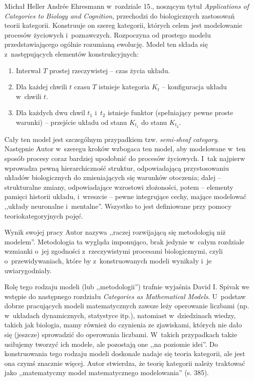 \begin{recplenv}{Michał Heller}
Andr\'ee Ehresmann w~rozdziale 15., noszącym tytuł \textit{Applications of Categories to Biology and Cognition}, przechodzi do biologicznych zastosowań teorii kategorii. Konstruuje on szereg kategorii, których celem jest modelowanie procesów życiowych i~poznawczych. Rozpoczyna od prostego modelu przedstawiającego ogólnie rozumianą ewolucję. Model ten składa się z~następujących elementów konstrukcyjnych:
\begin{enumerate}
\item
Interwał $T$ prostej rzeczywistej -- czas życia układu.
\item
Dla każdej chwili $t$ czasu $T$ istnieje kategoria $K_t$ -- konfiguracja układu w~chwili $t$.
\item
Dla każdych dwu chwil $t_1$ i~$t_2$ istnieje funktor (spełniający pewne proste warunki) -- przejście układu od stanu $K_{t_1}$ do stanu $K_{t_2}$.
\end{enumerate}
Cały ten model jest szczególnym przypadkiem tzw. \textit{semi-sheaf category}. Następnie Autor w~szeregu kroków wzbogaca ten model, aby modelowane w~ten sposób procesy coraz bardziej upodobnić do procesów życiowych. I~tak najpierw wprowadza pewną hierarchiczność struktur, odpowiadającą przystosowaniu układów biologicznych do zmieniających się warunków otoczenia; dalej -- strukturalne zmiany, odpowiadające wzrostowi złożoności, potem -- elementy pamięci historii układu, i~wreszcie -- pewne integrujące cechy, mające modelować ,,układy  neuronalne i~mentalne''. Wszystko to jest definiowane przy pomocy teoriokategoryjnych pojęć.

Wynik swojej pracy Autor nazywa ,,raczej rozwijającą się metodologią niż modelem''. Metodologia ta wygląda imponująco, brak jedynie w~całym rozdziale wzmianki o~jej zgodności z~rzeczywistymi procesami biologicznymi, czyli o~przewidywaniach, które by z~konstruowanych modeli wynikały i~je uwiarygodniały.

Rolę tego rodzaju modeli (lub ,,metodologii'') trafnie wyjaśnia David I. Spivak we wstępie do następnego rozdziału \textit{Categories as Mathematical Models}. U~podstaw dobrze pracujących modeli matematycznych zawsze leży operowanie liczbami (np. w~układach dynamicznych, statystyce itp.), natomiast w~dziedzinach wiedzy, takich jak biologia, mamy również do czynienia ze zjawiskami, których nie dało się (jeszcze) sprowadzić do operowania liczbami. W~takich przypadkach także usiłujemy tworzyć ich modele, ale pozostają one ,,na poziomie idei''. Do konstruowania tego rodzaju modeli doskonale nadaje się teoria kategorii, ale jest ona czymś znacznie więcej. Autor stwierdza, że teorię kategorii należy traktować jako ,,matematyczny model matematycznego modelowania'' (s. 385).


\end{recplenv}
